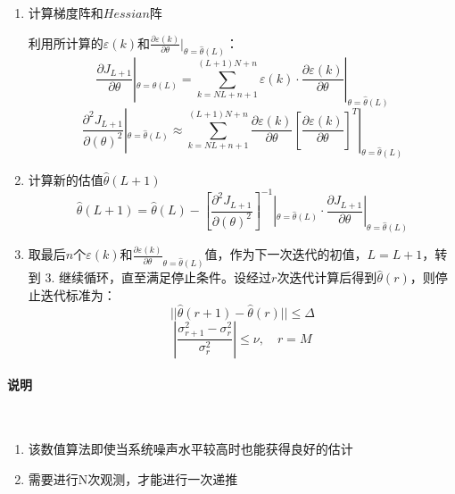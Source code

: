 \documentclass[UTF8, twocolumn]{article}
\begin{document}
\begin{enumerate}
    \item 计算梯度阵和$Hessian$阵
    
    利用所计算的$\varepsilon(k)$和$\frac{\partial \varepsilon(k)}{\partial \theta}|_{\theta = \hat{\theta}(L)}$：
    \begin{equation*}
        \frac{\partial J_{L + 1}}{\partial \theta}|_{\theta = \hat{\theta}(L)} = \sum_{k = NL + n + 1}^{(L + 1)N + n} \varepsilon(k) \cdot \frac{\partial \varepsilon(k)}{\partial \theta}|_{\theta = \hat{\theta}(L)} 
    \end{equation*}
    \begin{equation*}
        \frac{\partial^2 J_{L + 1}}{\partial (\theta)^2}|_{\theta = \hat{\theta}(L)} \approx \sum_{k = NL + n + 1}^{(L + 1)N + n}\frac{\partial \varepsilon(k)}{\partial \theta}[\frac{\partial \varepsilon(k)}{\partial \theta}]^T|_{\theta = \hat{\theta}(L)}
    \end{equation*}

    \item 计算新的估值$\hat{\theta}(L + 1)$
    \begin{equation*}
        \hat{\theta}(L + 1) = \hat{\theta}(L) - [\frac{\partial^2 J_{L + 1}}{\partial (\theta)^2}]^{-1}|_{\theta = \hat{\theta}(L)} \cdot \frac{\partial J_{L + 1}}{\partial \theta}|_{\theta = \hat{\theta}(L)}
    \end{equation*}

    \item 取最后$n$个$\varepsilon(k)$和$\frac{\partial \varepsilon(k)}{\partial \theta}_{\theta = \hat{\theta}(L)}$值，作为下一次迭代的初值，$L = L + 1$，转到 $3.$ 继续循环，直至满足停止条件。设经过$r$次迭代计算后得到$\hat{\theta}(r)$，则停止迭代标准为：
    \begin{equation*}
        || \hat{\theta}(r + 1) - \hat{\theta}(r) || \le \Delta 
    \end{equation*}
    \begin{equation*}
        | \frac{\sigma_{r + 1}^2 - \sigma_r^2}{\sigma_r^2} | \le \nu, \quad r = M
    \end{equation*}
\end{enumerate}

\paragraph{说明}~{}
\begin{enumerate}
    \item 该数值算法即使当系统噪声水平较高时也能获得良好的估计
    \item 需要进行N次观测，才能进行一次递推
\end{enumerate}
\end{document}
